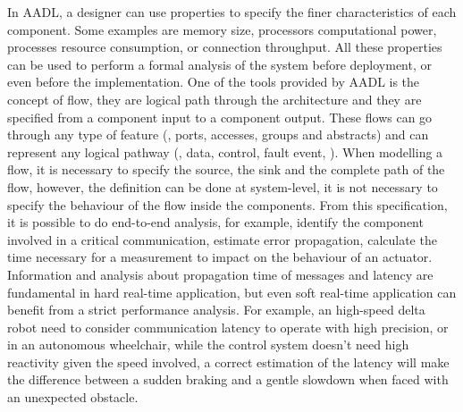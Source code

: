 In AADL, a designer can use properties to specify the finer characteristics of each component. Some examples are memory size, processors computational power, processes resource consumption, or connection throughput. All these properties can be used to perform a formal analysis of the system before deployment, or even before the implementation. One of the tools provided by AADL is the concept of flow, they are logical path through the architecture and they are specified from a component input to a component output. These flows can go through any type of feature (\ie, ports, accesses, groups and abstracts) and can represent any logical pathway (\eg, data, control, fault event, \etc). When modelling a flow, it is necessary to specify the source, the sink and the complete path of the flow, however, the definition can be done at system-level, it is not necessary to specify the behaviour of the flow inside the components. From this specification, it is possible to do end-to-end analysis, for example, identify the component involved in a critical communication, estimate error propagation, calculate the time necessary for a measurement to impact on the behaviour of an actuator. Information and analysis about propagation time of messages and latency are fundamental in hard real-time application, but even soft real-time application can benefit from a strict performance analysis. For example, an high-speed delta robot need to consider communication latency to operate with high precision, or in an autonomous wheelchair, while the control system doesn't need high reactivity given the speed involved, a correct estimation of the latency will make the difference between a sudden braking and a gentle slowdown when faced with an unexpected obstacle.


